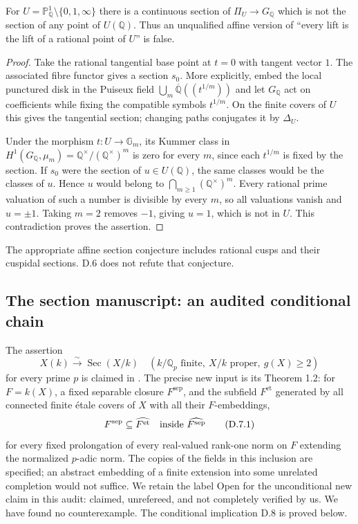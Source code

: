 For $U=\mathbb P^1_{\mathbb Q}\setminus\{0,1,\infty\}$ there is a continuous
section of $\Pi_U\to G_{\mathbb Q}$ which is not the section of any point of
$U(\mathbb Q)$.  Thus an unqualified affine version of ``every lift is the
lift of a rational point of $U$'' is false.
\begin{proof}
Take the rational tangential base point at $t=0$ with tangent vector $1$.
The associated fibre functor gives a section $s_0$.  More explicitly, embed the
local punctured disk in the Puiseux field
$\bigcup_m\overline{\mathbb Q}((t^{1/m}))$ and let $G_{\mathbb Q}$ act on
coefficients while fixing the compatible symbols $t^{1/m}$.  On the finite
covers of $U$ this gives the tangential section; changing paths conjugates it
by $\Delta_U$.

Under the morphism $t:U\to\mathbb G_m$, its Kummer class in
$H^1(G_{\mathbb Q},\mu_m)=\mathbb Q^\times/(\mathbb Q^\times)^m$ is zero for
every $m$, since each $t^{1/m}$ is fixed by the section.  If $s_0$ were the
section of $u\in U(\mathbb Q)$, the same classes would be the classes of $u$.
Hence $u$ would belong to $\bigcap_{m\geq1}(\mathbb Q^\times)^m$.
Every rational prime valuation of such a number is divisible by every $m$,
so all valuations vanish and $u=\pm1$.  Taking $m=2$ removes $-1$, giving
$u=1$, which is not in $U$.  This contradiction proves the assertion.
\end{proof}
The appropriate affine section conjecture includes rational cusps and their
cuspidal sections.  D.6 does not refute that conjecture.

\subsection{The section manuscript: an audited conditional chain}

The assertion
\[
 X(k)\xrightarrow{\sim}\operatorname{Sec}(X/k)
 \quad(k/\mathbb Q_p\text{ finite},\ X/k\text{ proper},\ g(X)\geq2)
\]
for every prime $p$ is claimed in \citet[Theorem 1.1]{OpenAI019}.
The precise new input is its Theorem 1.2: for $F=k(X)$, a fixed separable
closure $F^{\mathrm{sep}}$, and the subfield $F^{\mathrm{et}}$ generated by all
connected finite \'etale covers of $X$ with all their $F$-embeddings,
\[
 F^{\mathrm{sep}}\subseteq\widehat{F^{\mathrm{et}}}
 \quad\hbox{inside }\widehat{F^{\mathrm{sep}}}
 \tag{D.7.1}
\]
for every fixed prolongation of every real-valued rank-one norm on $F$
extending the normalized $p$-adic norm.  The copies of the fields in this
inclusion are specified; an abstract embedding of a finite extension into
some unrelated completion would not suffice.
We retain the label Open for the unconditional new claim in this audit:
claimed, unrefereed, and not completely verified by us.  We have found no
counterexample.  The conditional implication D.8 is proved below.

